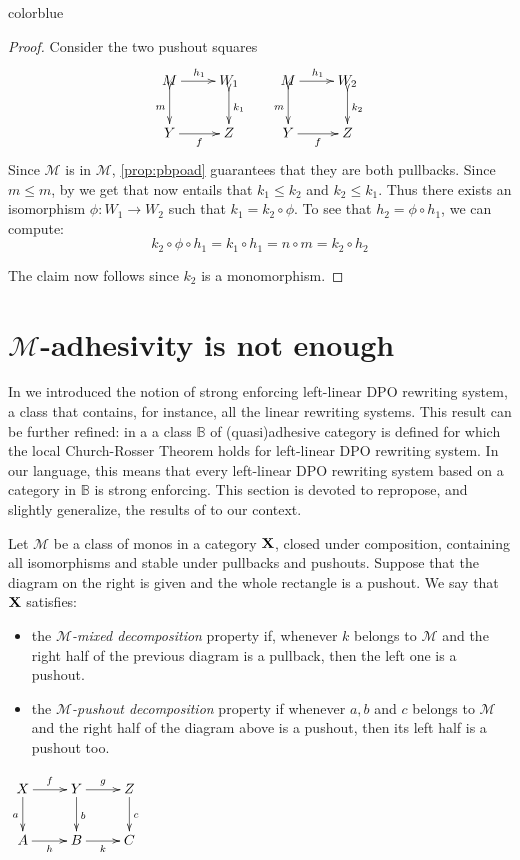 \documentclass[a4paper,UKenglish,cleveref,pdftex,thm-restate,numberwithinsect,anonymous]{lipics}
\newcommand{\full}[1]{{color{blue}#1}}
\newcommand{\full}[1]{}
\def\X{\textbf {\textup{X}}}
\def\Y{\textbf {\textup{Y}}}
\begin{document}
\full{ 
\begin{proof}
	Consider the two pushout squares
	\[\xymatrix{M \ar[r]^{h_1}\ar@{>->}[d]_{m}& W_1 \ar@{>->}[d]^{k_1} & M \ar@{>->}[d]_{m} \ar[r]^{h_1}& W_2 \ar@{>->}[d]^{k_2}\\Y\ar[r]_{f}&Z &Y \ar[r]_{f}&Z}\]
	Since $\mathcal{M}$ is in $\mathcal{M}$, \cref{prop:pbpoad} guarantees that they are both pullbacks.
	Since $m\leq m$, by \Cref{lem:radj} we get that now entails that $k_1\leq k_2$ and $k_2\leq k_1$. Thus there exists an isomorphism $\phi\colon W_1\to W_2$ such that $k_1=k_2\circ \phi$. To see that $h_2=\phi\circ h_1$, we can compute:
	\[
		k_2\circ \phi \circ h_1  = k_1\circ h_1= n\circ m= k_2\circ h_2\]

	The claim now follows since $k_2$ is a monomorphism.
\end{proof}}



\section{$\mathcal{M}$-adhesivity is not enough}\label{app:fill}
In  we introduced the notion of strong enforcing left-linear DPO rewriting system, a class that contains, for instance, all the linear rewriting systems. This result can be further refined: in a\cite{baldan2011adhesivity} a class  $\mathbb{B}$ of (quasi)adhesive category is defined for which the local Church-Rosser Theorem holds for left-linear DPO rewriting system. In our language, this means that every left-linear DPO rewriting system based on a category in $\mathbb{B}$ is strong enforcing. This section is devoted to repropose, and slightly generalize, the results of \cite{baldan2011adhesivity} to our context.

\noindent
\parbox{10.4cm}{
	\begin{definition}Let $\mathcal{M}$ be a class of monos in a category $\X$, closed under composition, containing all isomorphisms and stable under pullbacks and pushouts. Suppose that the  diagram on the right 	is given and the whole rectangle is a pushout. We say that $\X$ satisfies:
		\parbox{14cm}{\begin{itemize}
				\item the \emph{$\mathcal{M}$-mixed decomposition} property if, whenever $k$ belongs to $\mathcal{M}$ and the right half of the previous diagram is a pullback, then the left one is a pushout.
				\item the \emph{$\mathcal{M}$-pushout decomposition} property if whenever $a, b$ and $c$ belongs to $\mathcal{M}$ and the right half of the diagram above is a pushout, then its left half is a pushout too.
			\end{itemize}}
	\end{definition}} \parbox{3cm}{\vspace{-2cm}$\xymatrix{X \ar[d]_{a} \ar[r]^{f}& \ar[r]^{g} Y \ar[d]^{b}& Z \ar[d]^{c}\\ A \ar[r]_{h}& B \ar[r]_{k}& C}$}\\
\end{document}
